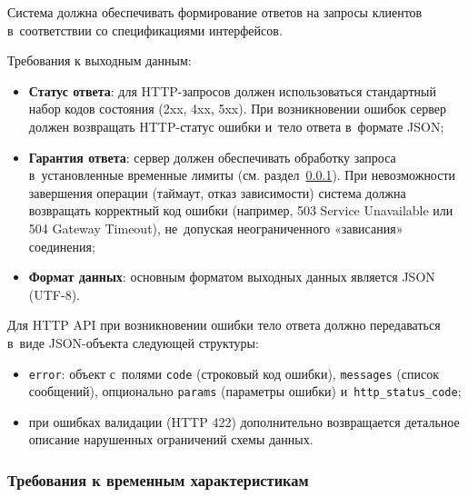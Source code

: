 \documentclass[12pt,a4paper]{extarticle}
\begin{document}
\begin{hseExample}
Система должна обеспечивать формирование ответов на запросы клиентов в~соответствии со спецификациями интерфейсов.

Требования к выходным данным:
\begin{itemize}[nosep, leftmargin=1.25cm]
    \item \textbf{Статус ответа}: для HTTP-запросов должен использоваться стандартный набор кодов состояния (2xx, 4xx, 5xx). При возникновении ошибок сервер должен возвращать HTTP-статус ошибки и~тело ответа в~формате JSON;
    \item \textbf{Гарантия ответа}: сервер должен обеспечивать обработку запроса в~установленные временные лимиты (см. раздел~\ref{sec:temporal_reqs}). При невозможности завершения операции (таймаут, отказ зависимости) система должна возвращать корректный код ошибки (например, 503 Service Unavailable или 504 Gateway Timeout), не~допуская неограниченного «зависания» соединения;
    \item \textbf{Формат данных}: основным форматом выходных данных является JSON (UTF-8).
\end{itemize}

Для HTTP API при возникновении ошибки тело ответа должно передаваться в~виде JSON-объекта следующей структуры:
\begin{itemize}[nosep, leftmargin=1.25cm]
    \item \texttt{error}: объект с~полями \texttt{code} (строковый код ошибки), \texttt{messages} (список сообщений), опционально \texttt{params} (параметры ошибки) и~\texttt{http\_status\_code};
    \item при ошибках валидации (HTTP 422) дополнительно возвращается детальное описание нарушенных ограничений схемы данных.
\end{itemize}
\end{hseExample}

\subsubsection{Требования к временным характеристикам}
\label{sec:temporal_reqs}
\end{document}
